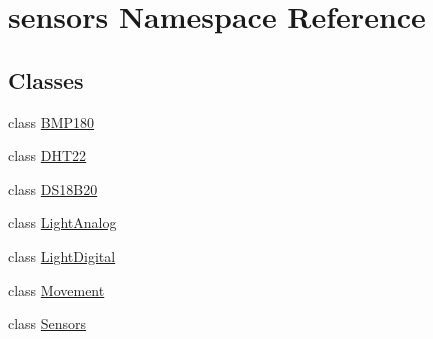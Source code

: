 \hypertarget{namespacesensors}{}\section{sensors Namespace Reference}
\label{namespacesensors}
\subsection*{Classes}
\begin{DoxyCompactItemize}
\item 
class \hyperlink{classsensors_1_1BMP180}{B\+M\+P180}
\item 
class \hyperlink{classsensors_1_1DHT22}{D\+H\+T22}
\item 
class \hyperlink{classsensors_1_1DS18B20}{D\+S18\+B20}
\item 
class \hyperlink{classsensors_1_1LightAnalog}{Light\+Analog}
\item 
class \hyperlink{classsensors_1_1LightDigital}{Light\+Digital}
\item 
class \hyperlink{classsensors_1_1Movement}{Movement}
\item 
class \hyperlink{classsensors_1_1Sensors}{Sensors}
\end{DoxyCompactItemize}
